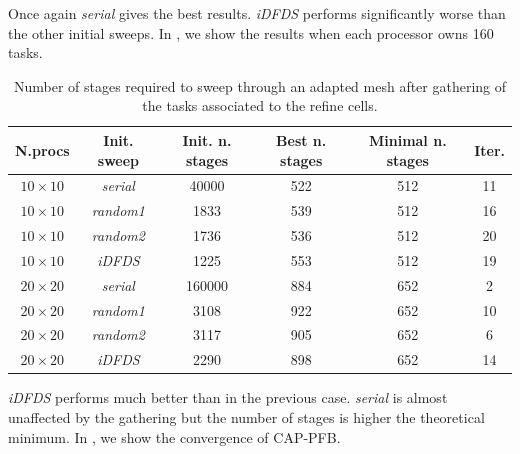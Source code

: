 \documentclass{mc2015}
\renewcommand{\(}{\left(}
\renewcommand{\)}{\right)}
\renewcommand{\[}{\left[}
\renewcommand{\]}{\right]}
\begin{document}
Once again \emph{serial} gives the best results. \emph{iDFDS} performs
significantly worse than the other initial sweeps. In , we show the results
when each processor owns 160 tasks.

\begin{table}[H]
  \begin{center}
    \caption{Number of stages required to sweep through an adapted mesh after
    gathering of the tasks associated to the refine cells.}
    \begin{tabular}{|c|c|c|c|c|c|}
      \hline
      N.procs & Init. sweep & Init. n. stages & Best n. stages & Minimal n. stages & Iter. \\
      \hline
      $10 \times 10$ &  \emph{serial} &  40000 &  522 & 512 & 11 \\
      $10 \times 10$ & \emph{random1} &   1833 &  539 & 512 & 16 \\
      $10 \times 10$ & \emph{random2} &   1736 &  536 & 512 & 20 \\
      $10 \times 10$ &   \emph{iDFDS} &   1225 &  553 & 512 & 19 \\
      $20 \times 20$ &  \emph{serial} & 160000 &  884 & 652 &  2 \\
      $20 \times 20$ & \emph{random1} &   3108 &  922 & 652 & 10 \\
      $20 \times 20$ & \emph{random2} &   3117 &  905 & 652 &  6 \\  
      $20 \times 20$ &   \emph{iDFDS} &   2290 &  898 & 652 & 14 \\
      \hline
    \end{tabular}
    \label{band_2}
  \end{center}
\end{table}

\emph{iDFDS} performs much better than in the previous case. \emph{serial} is
almost unaffected by the gathering but the number of stages is higher the
theoretical minimum. In , we show the convergence of CAP-PFB. 
\end{document}
